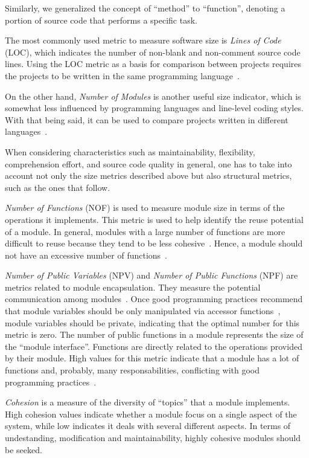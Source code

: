 \documentclass[conference]{IEEEtran}
\begin{document}
%
Similarly, we generalized the concept of ``method''
to ``function'', denoting a portion of source code that performs a specific task.

The most commonly used metric to measure software size is \emph{Lines of Code} (LOC), 
which indicates the number of non-blank and non-comment source code lines.
%
Using the LOC metric as a basis for comparison between projects requires
the projects to be written in the same programming language~\cite{Jones91}.


On the other hand, \emph{Number of Modules} is another useful size indicator,
which is somewhat less influenced by programming languages and line-level
coding styles. With that being said, it can be used to compare projects written in
different languages~\cite{Tempero}.

When considering characteristics such as maintainability, flexibility,
comprehension effort, and source code quality in general, one has to take into
account not only the size metrics described above but also structural metrics,
such as the ones that follow.

\emph{Number of Functions} (NOF) is used to measure module size in terms of
the operations it implements. 
%
This metric is used to help identify the reuse potential of a module.
In general, modules with a large number of functions are more difficult
to reuse because they tend to be less cohesive~\cite{Lorenz94}. 
%
Hence, a module should not have an excessive number of functions~\cite{beck97}.

\emph{Number of Public Variables} (NPV) and \emph{Number of Public Functions} (NPF)
are metrics related to module encapsulation. They measure the potential
communication among modules~\cite{Bansiya97}.
%
Once good programming practices recommend that module variables should be only
manipulated via accessor functions~\cite{beck97}, module variables 
should be private, indicating that the optimal number for this metric is zero.
%
The number of public functions in a module represents the size of the ``module interface''.
Functions are directly related to the operations provided by their module.
High values for this metric indicate that a module has a lot of functions and, probably,
many responsabilities, conflicting with good programming practices~\cite{beck97}.

\emph{Cohesion} is a measure of the diversity of ``topics'' that a
module implements. High cohesion values indicate whether a module focus on a
single aspect of the system, while low indicates it deals with several 
different aspects. In terms of undestanding, modification and maintainability,
highly cohesive modules should be seeked.
\end{document}
